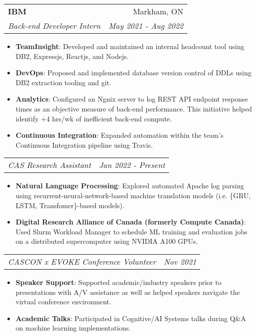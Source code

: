 \documentclass[letterpaper,11pt]{article}
\makeatletter
\newcommand{\resumeItem}[2]{
  \item\small{
    \textbf{#1}{: #2\vspace{-2pt}}
  }
}
\newcommand{\resumeSubheading}[4]{
  \vspace{-1pt}\item
    \begin{tabular*}{0.97\textwidth}[t]{l@{\extracolsep{\fill}}r}
      \textbf{\large#1} & #2 \\
      \textit{\small#3} & \textit{\small #4} \\
    \end{tabular*}\vspace{-5pt}
}
\newcommand{\resumeSubSubheading}[2]{
    \begin{tabular*}{0.97\textwidth}{l@{\extracolsep{\fill}}r}
      \textit{\small#1} & \textit{\small #2} \\
    \end{tabular*}\vspace{-5pt}
}
\newcommand{\resumeSubHeadingListEnd}{\end{itemize}}
\newcommand{\resumeItemListStart}{\begin{itemize}}
\newcommand{\resumeItemListEnd}{\end{itemize}\vspace{-5pt}}
\makeatother
\begin{document}
    \resumeSubheading
      {IBM}{Markham, ON}
      {Back-end Developer Intern}{May 2021 - Aug 2022}
      \resumeItemListStart
        \resumeItem{TeamInsight}
          {Developed and maintained an internal headcount tool using DB2, Expressjs, Reactjs, and Nodejs.}
        \resumeItem{DevOps}
          {Proposed and implemented database version control of DDLs using DB2 extraction tooling and git.}
        \resumeItem{Analytics}
          {Configured an Ngnix server to log REST API endpoint response times as an objective measure of back-end performance. This initiative helped identify +4 hrs/wk of inefficient back-end compute.}
      	\resumeItem{Continuous Integration}
     	  {Expanded automation within the team's Continuous Integration pipeline using Travis.}
      \resumeItemListEnd
      \resumeSubSubheading
		{CAS Research Assistant}{Jan 2022 - Present}
		\resumeItemListStart
		\resumeItem{Natural Language Processing}
		{Explored automated Apache log parsing using recurrent-neural-network-based machine translation models (i.e. \{GRU, LSTM, Transfomer\}-based models).}
		\resumeItem{Digital Research Alliance of Canada (formerly Compute Canada)}
		{Used Slurm Workload Manager to schedule ML training and evaluation jobs on a distributed supercomputer using NVIDIA A100 GPUs.}
		\resumeItemListEnd
      \resumeSubSubheading
		{CASCON x EVOKE Conference Volunteer}{Nov 2021}
		\resumeItemListStart
		\resumeItem{Speaker Support}
		{Supported academic/industry speakers prior to presentations with A/V assistance as well as helped speakers navigate the virtual conference environment.}
		\resumeItem{Academic Talks}
		{Participated in Cognitive/AI Systems talks during Q\&A on machine learning implementations.}
		\resumeItemListEnd
      
	
\end{document}
